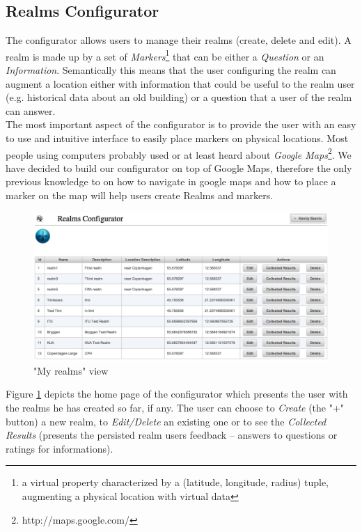 \subsection{Realms Configurator}
The configurator allows users to manage their realms (create, delete and edit). A realm is made up by a set of \emph{Markers}\footnote{a virtual property characterized by a (latitude, longitude, radius) tuple, augmenting a physical location with virtual data} that can be either a \emph{Question} or an \emph{Information}. Semantically this means that the user configuring the realm can augment a location either with information that could be useful to the realm user (e.g. historical data about an old building)  or a question that a user of the realm can answer.
\\

\noindent The most important aspect of the configurator is to provide the user with an easy to use and intuitive interface to easily place markers on physical locations. Most people using computers probably used or at least heard about \emph{Google Maps}\footnote{http://maps.google.com/}. We have decided to build our configurator on top of Google Maps, therefore the only previous knowledge to on how to navigate in google maps and how to place a marker on the map will help users create Realms and markers.\\
\begin{figure}[H] 
	\centering
	\includegraphics[width=\linewidth]{fig/my_realms.png}
	\caption{"My realms" view}
	\label{fig.my_realms}
\end{figure}

\noindent Figure \ref{fig.my_realms} depicts the home page of the configurator which presents the user with the realms he has created so far, if any. The user can choose to \emph{Create} (the "+" button) a new realm, to \emph{Edit/Delete} an existing one or to see the \emph{Collected Results} (presents the persisted realm users feedback -- answers to questions or ratings for informations).
\\

